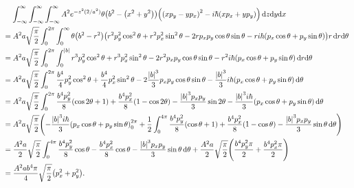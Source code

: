 \documentclass[11pt, letterpaper]{article}
\renewcommand{\left}{\mleft}
\renewcommand{\right}{\mright}
\begin{document}
\begin{enumerate}
\begin{align*}
			&\;\;\;\; \int_{-\infty }^{\infty }\int_{-\infty }^{\infty }\int_{-\infty }^{\infty } A^2e^{-z^2(2/a^2)} \theta \left( b^2-\left( x^2+y^2 \right)  \right) \left(\left( xp_y-yp_x \right) ^2-i\hbar \left( xp_x+yp_y \right)\right)  \,\mathrm{d} z \mathrm{d} y \mathrm{d} x\\
			&=A^2a\sqrt{\frac{\pi }{2} } \int_{0}^{2\pi }\int_{0}^{\infty } \theta \left( b^2-r^2 \right) \left( r^2 p^2_y \cos ^2\theta +r^2p^2_x \sin ^2\theta -2rp_xp_y \cos \theta \sin \theta -ri\hbar \left( p_x \cos \theta +p_y \sin \theta  \right)  \right) r \,\mathrm{d} r \mathrm{d} \theta \\
			&=A^2a\sqrt{\frac{\pi }{2} } \int_{0}^{2\pi }\int_{0}^{\left| b \right|} r^3 p^2_y \cos ^2\theta +r^3p^2_x \sin ^2\theta -2r^2p_xp_y \cos \theta \sin \theta -r^2i\hbar \left( p_x \cos \theta +p_y \sin \theta  \right) \,\mathrm{d} r \mathrm{d} \theta \\
			&=A^2a\sqrt{\frac{\pi }{2} } \int_{0}^{2\pi } \frac{b^4}{4} p_y^2 \cos ^2\theta +\frac{b^4}{4} p_x^2 \sin ^2\theta -2\frac{\left| b \right| ^3}{3} p_xp_y \cos \theta \sin \theta -\frac{\left| b \right|^3}{3} i\hbar \left( p_x \cos \theta +p_y \sin \theta  \right)  \,\mathrm{d} \theta \\
			&=A^2 a \sqrt{\frac{\pi }{2} } \int_{0}^{2\pi } \frac{b^4p_y^2}{8} \left( \cos 2\theta +1 \right) +\frac{b^4p_x^2}{8} \left( 1-\cos 2\theta  \right) -\frac{\left| b \right| ^3p_xp_y}{3} \sin 2\theta -\frac{\left| b \right| ^3i\hbar }{3} \left( p_x \cos \theta +p_y \sin \theta  \right)  \,\mathrm{d} \theta \\
			&=A^2a\sqrt{\frac{\pi }{2} } \left( -\frac{\left| b \right| ^3i\hbar }{3} \left( p_x \cos \theta +p_y \sin \theta  \right)_0^{2\pi } +\frac{1}{2} \int_{0}^{4\pi } \frac{b^4p_y^2}{8} (\cos \theta +1)+\frac{b^4p_x^2}{8} (1-\cos \theta )-\frac{\left| b \right| ^3p_xp_y}{3} \sin \theta  \,\mathrm{d} \theta  \right) \\
			&=\frac{A^2a}{2} \sqrt{\frac{\pi }{2} } \int_{0}^{4\pi } \frac{b^4p_y^2}{8} \cos \theta -\frac{b^4p_x^2}{8} \cos \theta -\frac{\left| b \right| ^3p_xp_y}{3} \sin \theta  \,\mathrm{d} \theta +\frac{A^2a}{2} \sqrt{\frac{\pi }{2} } \left( \frac{b^4p_y^2 \pi }{2} +\frac{b^4p_x^2\pi }{2}  \right) \\
			&=\frac{A^2ab^4\pi }{4} \sqrt{\frac{\pi }{2} } \left( p_x^2+p_y^2 \right) 
		.\end{align*}
\end{enumerate}
\end{document}
